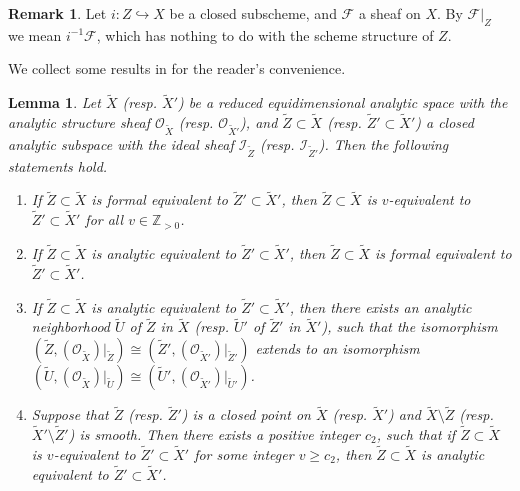 \documentclass[11pt]{amsart}
\numberwithin{equation}{section}
\newcommand{\Zz}{\mathbb{Z}}
\newtheorem{lem}[thm]{Lemma}
\theoremstyle{definition}
\newtheorem{rem}[thm]{Remark}
\theoremstyle{definition}
\begin{document}
\begin{rem}
Let $i:Z\hookrightarrow X$ be a closed subscheme, and $\mathcal{F}$ a sheaf on $X$. By $\mathcal{F}|_Z$ we mean $i^{-1}\mathcal{F}$, which has nothing to do with the scheme structure of $Z$.
\end{rem}

We collect some results in \cite{HR64} for the reader's convenience.

\begin{lem}\label{lem: basic properties of equivalence relation}
Let $\tilde{X}$ (resp. $\tilde{X}'$) be a reduced equidimensional analytic space with the analytic structure sheaf $\mathcal{O}_{\tilde{X}}$ (resp. $\mathcal{O}_{\tilde{X}'}$), and $\widetilde{Z}\subset \tilde{X}$ (resp. $\tilde{Z}'\subset \tilde{X}'$) a closed analytic subspace with the ideal sheaf $\mathcal{I}_{\tilde{Z}}$ (resp. $\mathcal{I}_{\tilde{Z}'}$). Then the following statements hold.
\begin{enumerate}
    \item If $\tilde{Z}\subset \tilde{X}$ is formal equivalent to $\tilde{Z}'\subset \tilde{X}'$, then $\tilde{Z}\subset \tilde{X}$ is $v$-equivalent to $\tilde{Z}'\subset \tilde{X}'$ for all $v\in \Zz_{>0}$.
    \item If $\tilde{Z}\subset \tilde{X}$ is analytic equivalent to $\tilde{Z}'\subset \tilde{X}'$, then $\tilde{Z}\subset \tilde{X}$ is formal equivalent to $\tilde{Z}'\subset \tilde{X}'$.
    \item If $\tilde{Z}\subset \tilde{X}$ is analytic equivalent to $\tilde{Z}'\subset \tilde{X}'$, then there exists an analytic neighborhood $\tilde{U}$ of $\tilde{Z}$ in $\tilde{X}$ (resp. $\tilde{U}'$ of $\tilde{Z}'$ in $\tilde{X}'$), such that the isomorphism $(\tilde{Z}, (\mathcal{O}_{\tilde{X}})|_{\tilde{Z}})\cong (\tilde{Z}', (\mathcal{O}_{\tilde{X}'})|_{\tilde{Z}'})$ extends to an isomorphism $(\tilde{U}, (\mathcal{O}_{\tilde{X}})|_{\tilde{U}})\cong (\tilde{U}', (\mathcal{O}_{\tilde{X}'})|_{\tilde{U}'})$.
    \item Suppose that $\tilde{Z}$ (resp. $\tilde{Z}'$) is a closed point on $\tilde{X}$ (resp. $\tilde{X}'$) and  $\tilde{X}\setminus \tilde{Z}$ (resp. $\tilde{X}'\setminus \tilde{Z}'$) is smooth. Then there exists a positive integer $c_2$, such that if $\tilde{Z}\subset \tilde{X}$ is $v$-equivalent to $\tilde{Z}'\subset \tilde{X}'$ for some integer $v\geq  c_2$, then $\tilde{Z}\subset \tilde{X}$ is analytic equivalent to $\tilde{Z}'\subset \tilde{X}'$.
\end{enumerate}
\end{lem}
\end{document}
